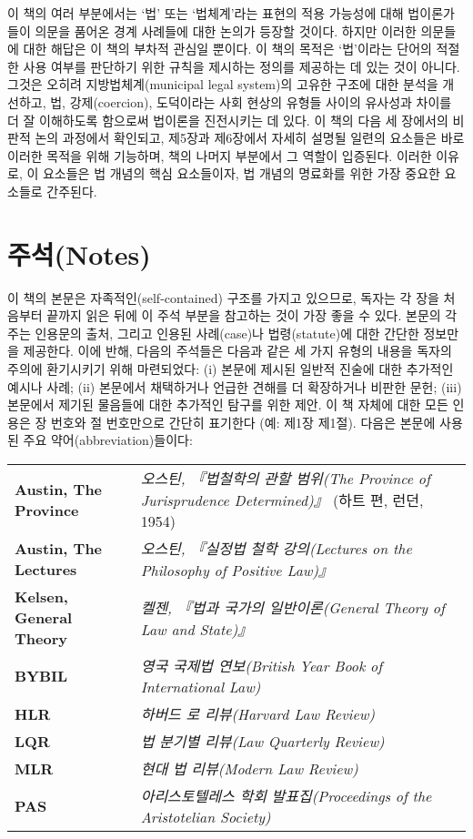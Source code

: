\documentclass[12pt, oneside]{book}  %
\begin{document}
이 책의 여러 부분에서는 `법' 또는 `법체계'라는 표현의 적용 가능성에 대해
법이론가들이 의문을 품어온 경계 사례들에 대한 논의가 등장할 것이다.
하지만 이러한 의문들에 대한 해답은 이 책의 부차적 관심일 뿐이다. 이 책의
목적은 `법'이라는 단어의 적절한 사용 여부를 판단하기 위한 규칙을
제시하는 정의를 제공하는 데 있는 것이 아니다. 그것은 오히려
지방법체계(municipal legal system)의 고유한 구조에 대한 분석을 개선하고,
법, 강제(coercion), 도덕이라는 사회 현상의 유형들 사이의 유사성과 차이를
더 잘 이해하도록 함으로써 법이론을 진전시키는 데 있다. 이 책의 다음 세
장에서의 비판적 논의 과정에서 확인되고, 제5장과 제6장에서 자세히 설명될
일련의 요소들은 바로 이러한 목적을 위해 기능하며, 책의 나머지 부분에서
그 역할이 입증된다. 이러한 이유로, 이 요소들은 법 개념의 핵심
요소들이자, 법 개념의 명료화를 위한 가장 중요한 요소들로 간주된다.

\newpage

\section{주석(Notes)}\label{uxc8fcuxc11dnotes}

이 책의 본문은 자족적인(self-contained) 구조를 가지고 있으므로, 독자는
각 장을 처음부터 끝까지 읽은 뒤에 이 주석 부분을 참고하는 것이 가장 좋을
수 있다. 본문의 각주는 인용문의 출처, 그리고 인용된 사례(case)나
법령(statute)에 대한 간단한 정보만을 제공한다. 이에 반해, 다음의
주석들은 다음과 같은 세 가지 유형의 내용을 독자의 주의에 환기시키기 위해
마련되었다: (i) 본문에 제시된 일반적 진술에 대한 추가적인 예시나 사례;
(ii) 본문에서 채택하거나 언급한 견해를 더 확장하거나 비판한 문헌; (iii)
본문에서 제기된 물음들에 대한 추가적인 탐구를 위한 제안. 이 책 자체에
대한 모든 인용은 장 번호와 절 번호만으로 간단히 표기한다 (예: 제1장
제1절). 다음은 본문에 사용된 주요 약어(abbreviation)들이다:

\vspace{1em}

\begin{tabular}{@{}l p{10cm}@{}}
\textbf{Austin, The Province}   & \textit{오스틴, 『법철학의 관할 범위(The Province of Jurisprudence Determined)』} (하트 편, 런던, 1954) \\
\textbf{Austin, The Lectures}   & \textit{오스틴, 『실정법 철학 강의(Lectures on the Philosophy of Positive Law)』} \\
\textbf{Kelsen, General Theory} & \textit{켈젠, 『법과 국가의 일반이론(General Theory of Law and State)』} \\
\textbf{BYBIL}                  & \textit{영국 국제법 연보(British Year Book of International Law)} \\
\textbf{HLR}                    & \textit{하버드 로 리뷰(Harvard Law Review)} \\
\textbf{LQR}                    & \textit{법 분기별 리뷰(Law Quarterly Review)} \\
\textbf{MLR}                    & \textit{현대 법 리뷰(Modern Law Review)} \\
\textbf{PAS}                    & \textit{아리스토텔레스 학회 발표집(Proceedings of the Aristotelian Society)} \\
\end{tabular}  %
\end{document}
